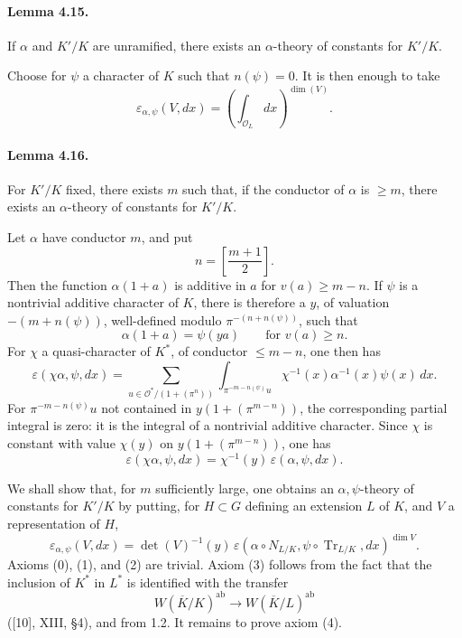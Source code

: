 \documentclass[10pt,letterpaper]{article}
\newcommand{\Tr}{\operatorname{Tr}}
\providecommand{\ab}{\mathrm{ab}}
\providecommand{\ab}{\mathrm{ab}}
\providecommand{\ab}{\mathrm{ab}}
\providecommand{\Tr}{\operatorname{Tr}}
\providecommand{\Tr}{\operatorname{Tr}}
\providecommand{\Tr}{\operatorname{Tr}}
\begin{document}
\paragraph{Lemma 4.15.} If \(\alpha\) and \(K'/K\) are unramified, there exists an \(\alpha\)-theory of constants for \(K'/K\).

Choose for \(\psi\) a character of \(K\) such that \(n(\psi)=0\). It is then enough to take
\[
\varepsilon_{\alpha,\psi}(V,dx)=
\left(\int_{\mathcal O_L} dx\right)^{\dim(V)}.
\]

\paragraph{Lemma 4.16.} For \(K'/K\) fixed, there exists \(m\) such that, if the conductor of \(\alpha\) is \(\ge m\), there exists an \(\alpha\)-theory of constants for \(K'/K\).

Let \(\alpha\) have conductor \(m\), and put
\[
n=\left[\frac{m+1}{2}\right].
\]
Then the function \(\alpha(1+a)\) is additive in \(a\) for \(v(a)\ge m-n\). If \(\psi\) is a nontrivial additive character of \(K\), there is therefore a \(y\), of valuation \(-(m+n(\psi))\), well-defined modulo \(\pi^{-(n+n(\psi))}\), such that
\[
\alpha(1+a)=\psi(ya)\qquad\text{for }v(a)\ge n.
\]
For \(\chi\) a quasi-character of \(K^*\), of conductor \(\le m-n\), one then has
\[
\tag{4.16.1}
\varepsilon(\chi\alpha,\psi,dx)
=
\sum_{u\in\mathcal O^*/(1+(\pi^n))}
\int_{\pi^{-m-n(\psi)}u}
\chi^{-1}(x)\alpha^{-1}(x)\psi(x)\,dx.
\]
For \(\pi^{-m-n(\psi)}u\) not contained in \(y(1+(\pi^{m-n}))\), the corresponding partial integral is zero: it is the integral of a nontrivial additive character. Since \(\chi\) is constant with value \(\chi(y)\) on \(y(1+(\pi^{m-n}))\), one has
\[
\varepsilon(\chi\alpha,\psi,dx)
=
\chi^{-1}(y)\,\varepsilon(\alpha,\psi,dx).
\]

We shall show that, for \(m\) sufficiently large, one obtains an \(\alpha,\psi\)-theory of constants for \(K'/K\) by putting, for \(H\subset G\) defining an extension \(L\) of \(K\), and \(V\) a representation of \(H\),
\[
\varepsilon_{\alpha,\psi}(V,dx)
=
\det(V)^{-1}(y)\,
\varepsilon(\alpha\circ N_{L/K},\psi\circ\Tr_{L/K},dx)^{\dim V}.
\]
Axioms (0), (1), and (2) are trivial. Axiom (3) follows from the fact that the inclusion of \(K^*\) in \(L^*\) is identified with the transfer
\[
W(\overline K/K)^{\ab}\longrightarrow W(\overline K/L)^{\ab}
\]
([10], XIII, §4), and from 1.2. It remains to prove axiom (4).
\end{document}
